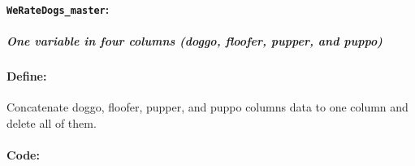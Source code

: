 \documentclass[11pt]{article}
\begin{document}
    \hypertarget{weratedogs_master}{%
\paragraph{\texorpdfstring{\texttt{WeRateDogs\_master}:}{WeRateDogs\_master:}}\label{weratedogs_master}}

\hypertarget{one-variable-in-four-columns-doggo-floofer-pupper-and-puppo}{%
\subparagraph{One variable in four columns (doggo, floofer, pupper, and
puppo)}\label{one-variable-in-four-columns-doggo-floofer-pupper-and-puppo}}

\hypertarget{define}{%
\paragraph{Define:}\label{define}}

Concatenate doggo, floofer, pupper, and puppo columns data to one column
and delete all of them.

\hypertarget{code}{%
\paragraph{Code:}\label{code}}
\end{document}
